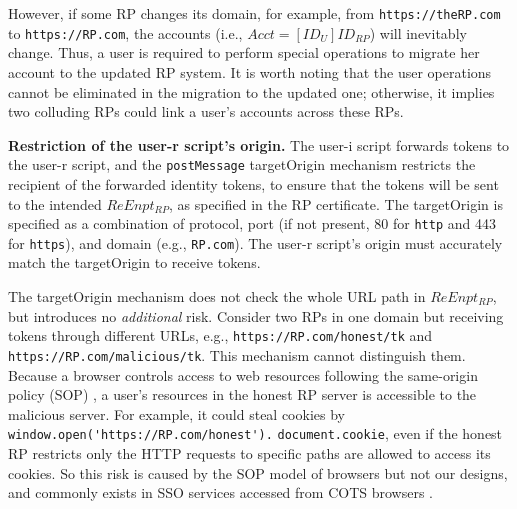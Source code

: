 However, if some RP changes its domain, for example, from \verb+https://theRP.com+ to \verb+https://RP.com+, the accounts (i.e., $Acct = [ID_U]ID_{RP}$) will inevitably change.
Thus, a user is required to perform special operations to migrate her account to the updated RP system.
It is worth noting that the user operations cannot be eliminated in the migration to the updated one;
otherwise, it implies two colluding RPs could link a user's accounts across these RPs.


\noindent \textbf{Restriction of the user-r script's origin.}
The user-i script forwards tokens to the user-r script, and the \verb+postMessage+ targetOrigin mechanism \cite{postm-targeto} restricts the recipient of the forwarded identity tokens, to ensure that the tokens will be sent to the intended $ReEnpt_{RP}$, as specified in the RP certificate. The targetOrigin is specified as a combination of protocol, port (if not present, 80 for \verb+http+ and 443 for \verb+https+), and domain (e.g., \verb+RP.com+).
The user-r script's origin must accurately match the targetOrigin to receive tokens.

The targetOrigin mechanism does not check the whole URL path in $ReEnpt_{RP}$, but introduces no {\em additional} risk.
Consider two RPs in one domain but receiving tokens through different URLs,
 e.g., \verb+https://RP.com/honest/tk+ and \verb+https://RP.com/malicious/tk+.
This mechanism cannot distinguish them.
%
%
Because a browser controls access to web resources following the same-origin policy (SOP) \cite{sop},
    a user's resources in the honest RP server is accessible to  the malicious server.
 For example, it could steal cookies by \verb+window.open('https://RP.com/honest').+ \verb+document.cookie+,
 even if the honest RP restricts only the HTTP requests to specific paths are allowed to access its cookies.
So this risk is caused by the SOP model of browsers but not our designs,
    and commonly exists in SSO services accessed from COTS browsers \cite{rfc6749,SPRESSO,MITREid,GoogleIdIntegrate,uber}.





